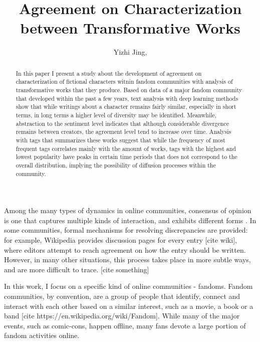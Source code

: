 \documentclass{pnastwo}
\begin{document}
\title{Agreement on Characterization between Transformative Works}

\author{Yizhi Jing,
}


\maketitle

\begin{article}
\begin{abstract}
{In this paper I present a study about the development of agreement on characterization of fictional characters witnin fandom communities with analysis of transformative works that they produce. Based on data of a major fandom community that developed within the past a few years,  text analysis with deep learning methods show that while writings about a character remains fairly similar, especially in short terms, in long terms a higher level of diversity may be identified. Meanwhile,  abstraction to the sentiment level indicates that although considerable divergence remains between creators, the agreement level tend to increase over time. Analysis with tags that summarizes these works suggest that while the frequency of most frequent tags correlates mainly with the amount of works, tags with the highest and lowest popularity have peaks in certain time periods that does not correspond to the overall distribution, implying the possibility of diffusion processes within the community. }
\end{abstract}


Among the many types of dynamics in online communities, consensus of opinion is one that captures multiple kinds of interaction, and exhibits different forms . In some communities, formal mechanisms for resolving discrepancies are provided: for example, Wikipedia provides discussion pages for every entry [cite wiki], where editors attempt to reach agreement on how the entry should be written. However, in many other situations, this process takes place in more subtle ways, and are more difficult to trace. [cite something]

In this work, I focus on a specific kind of online communities - fandoms. Fandom communities, by convention, are a group of people that identify, connect and interact with each other based on a similar interest, such as a movie, a book or a band [cite https://en.wikipedia.org/wiki/Fandom]. While many of the major events, such as comic-cons, happen offline, many fans devote a large portion of fandom activities online.


\end{article}
\end{document}
